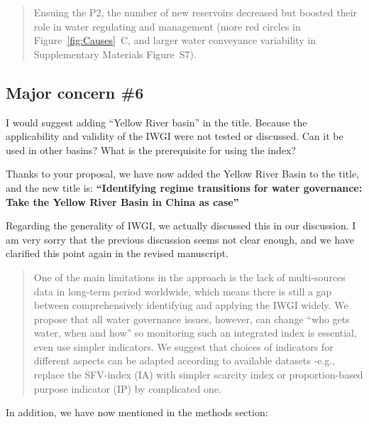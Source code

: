 \begin{quote}
	Ensuing the P2, the number of new reservoirs decreased but boosted their role in water regulating and management (more red circles in Figure~\ref{fig:Causes}~C, and larger water conveyance variability in Supplementary Materials Figure~S7).  %
\end{quote}

\subsection{Major concern \#6}
\RC{} I would suggest adding ``Yellow River basin'' in the title. Because the applicability and validity of the IWGI were not tested or discussed. Can it be used in other basins? What is the prerequisite for using the index?

\AR{} Thanks to your proposal, we have now added the Yellow River Basin to the title, and the new title is: \textbf{``Identifying regime transitions for water governance: Take the Yellow River Basin in China as case''}

\AR*{} Regarding the generality of IWGI, we actually discussed this in our discussion. I am very sorry that the previous discussion seems not clear enough, and we have clarified this point again in the revised manuscript.

\begin{quote}
	One of the main limitations in the approach is the lack of multi-sources data in long-term period worldwide, which means there is still a gap between comprehensively identifying and applying the IWGI widely.
	We propose that all water governance issues, however, can change ``who gets water, when and how'' so monitoring such an integrated index is essential, even use simpler indicators.
	We suggest that choices of indicators for different aspects can be adapted according to available datasets -e.g., replace the SFV-index (IA) with simpler scarcity index or proportion-based purpose indicator (IP) by complicated one.
\end{quote}

\AR*{} In addition, we have now mentioned in the methods section:

